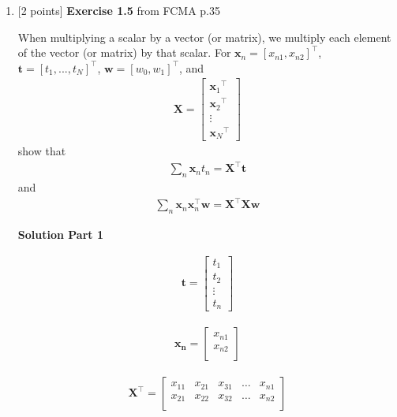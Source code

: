 \documentclass[10pt]{article}
\begin{document}
\begin{enumerate}
\item \label{prob:5} [2 points]
{\bf Exercise 1.5} from FCMA p.35  %

When multiplying a scalar by a vector (or matrix), we multiply each element of the vector (or matrix) by that scalar.  For $\mathbf{x}_n = {[ x_{n1}, x_{n2} ]}^\top$, $\mathbf{t} = {[ t_1,...,t_N ]}^\top$, $\mathbf{w} = {[ w_0, w_1 ]}^\top$, and
\begin{eqnarray*}
\mathbf{X} = 
    \begin{bmatrix}
    {\mathbf{x}_{1}}^\top \\[0.3em]
    {\mathbf{x}_{2}}^\top \\[0.3em]
    \vdots \\[0.3em]
    {\mathbf{x}_{N}}^\top
    \end{bmatrix}
\end{eqnarray*}
show that
\begin{eqnarray*}
\sum_{n} \mathbf{x}_n t_n = \mathbf{X}^\top\mathbf{t}
\end{eqnarray*}
and
\begin{eqnarray*}
\sum_{n} \mathbf{x}_n \mathbf{x}_n ^\top \mathbf{w} = \mathbf{X}^\top\mathbf{X} \mathbf{w}
\end{eqnarray*}

{\bf Solution Part 1}

\begin{eqnarray*}
	\mathbf{t} =
	\begin{bmatrix}
	t_1 \\
	t_2 \\
	\vdots \\
	t_n
	\end{bmatrix}
\end{eqnarray*}

\begin{eqnarray*}
	\mathbf{x_n} =
	\begin{bmatrix}
	x_{n1} \\
	x_{n2} \\
	\end{bmatrix}
\end{eqnarray*}
	
\begin{eqnarray*}
	\mathbf{X}^\top =
	\begin{bmatrix}
	x_{11} & x_{21} & x_{31} & \dots & x_{n1}\\
	x_{21} & x_{22} & x_{32} & \dots & x_{n2}\\
	\end{bmatrix}
\end{eqnarray*}


\end{enumerate}
\end{document}
